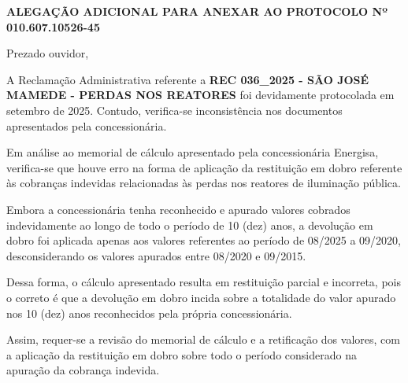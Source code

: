 \documentclass[12pt]{article}
\newcommand{\protocolo}{010.607.10526-45}
\newcommand{\reclamacao}{REC 036\_2025 - SÃO JOSÉ MAMEDE - PERDAS NOS REATORES}
\newcommand{\data}{setembro de 2025}
\begin{document}
\begin{center}\textbf{ALEGAÇÃO ADICIONAL PARA ANEXAR AO PROTOCOLO Nº \protocolo{}}\end{center}
\vspace{0.5cm}
Prezado ouvidor,

A Reclamação Administrativa referente a \textbf{\reclamacao{}} foi devidamente protocolada em \data{}. Contudo, verifica-se inconsistência nos documentos apresentados pela concessionária.

Em análise ao memorial de cálculo apresentado pela concessionária Energisa, verifica-se que houve erro na forma de aplicação da restituição em dobro referente às cobranças indevidas relacionadas às perdas nos reatores de iluminação pública.

Embora a concessionária tenha reconhecido e apurado valores cobrados indevidamente ao longo de todo o período de 10 (dez) anos, a devolução em dobro foi aplicada apenas aos valores referentes ao período de 08/2025 a 09/2020, desconsiderando os valores apurados entre 08/2020 e 09/2015.

Dessa forma, o cálculo apresentado resulta em restituição parcial e incorreta, pois o correto é que a devolução em dobro incida sobre a totalidade do valor apurado nos 10 (dez) anos reconhecidos pela própria concessionária.

Assim, requer-se a revisão do memorial de cálculo e a retificação dos valores, com a aplicação da restituição em dobro sobre todo o período considerado na apuração da cobrança indevida.
\end{document}
